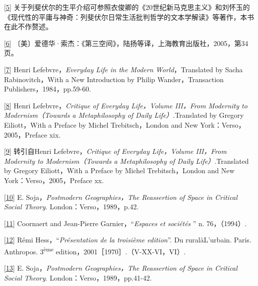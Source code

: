 \documentclass[UTF8, fontset = sourcesans, a4paper, oneside, zihao =
-4, scheme=chinese, no-math, space=true]{ctexbook}
\begin{document}
\protect\hypertarget{part0004.htmlux5cux23m5}{}{}\protect\hyperlink{part0004.htmlux5cux23w5}{{[}5{]}}
关于列斐伏尔的生平介绍可参照衣俊卿的《20世纪新马克思主义》和刘怀玉的《现代性的平庸与神奇：列斐伏尔日常生活批判哲学的文本学解读》等著作，本书在此不作赘述。

\protect\hypertarget{part0004.htmlux5cux23m6}{}{}\protect\hyperlink{part0004.htmlux5cux23w6}{{[}6{]}}
〔美〕爱德华·索杰：《第三空间》，陆扬等译，上海教育出版社，2005，第34页。

\protect\hypertarget{part0004.htmlux5cux23m7}{}{}\protect\hyperlink{part0004.htmlux5cux23w7}{{[}7{]}}
Henri Lefebvre，\emph{Everyday Life in the Modern World}，Translated by
Sacha Rabinovitch，With a New Introduction by Philip Wander，Transaction
Publishers，1984，pp.59-60.

\protect\hypertarget{part0004.htmlux5cux23m8}{}{}\protect\hyperlink{part0004.htmlux5cux23w8}{{[}8{]}}
Henri Lefebvre，\emph{Critique of Everyday Life，Volume III，From
Modernity to Modernism（Towards a Metaphilosophy of Daily
Life）}.Translated by Gregory Eiliott，With a Preface by Michel
Trebitsch，London and New York：Verso，2005，Preface xix.

\protect\hypertarget{part0004.htmlux5cux23m9}{}{}\protect\hyperlink{part0004.htmlux5cux23w9}{{[}9{]}}
转引自Henri Lefebvre，\emph{Critique of Everyday Life，Volume III，From
Modernity to Modernism（Towards a Metaphilosophy of Daily
Life）}.Translated by Gregory Eiliott，With a Preface by Michel
Trebitsch，London and New York：Verso，2005，Preface xx.

\protect\hypertarget{part0004.htmlux5cux23m10}{}{}\protect\hyperlink{part0004.htmlux5cux23w10}{{[}10{]}}
E. Soja，\emph{Postmodern Geographies，The Reassertion of Space in
Critical Social Theory}. London：Verso，1989，p.42.

\protect\hypertarget{part0004.htmlux5cux23m11}{}{}\protect\hyperlink{part0004.htmlux5cux23w11}{{[}11{]}}
Coornaert and Jean-Pierre Garnier，``\emph{Espaces et sociétés} '' n.
76，（1994）.

\protect\hypertarget{part0004.htmlux5cux23m12}{}{}\protect\hyperlink{part0004.htmlux5cux23w12}{{[}12{]}}
Rémi Hess，``\emph{Présentation de la troisième edition}''. Du
ruralàL'urbain. Paris. Anthropos. 3\textsuperscript{ème}
edition，2001［1970］.（V-XX-VI，VI）.

\protect\hypertarget{part0004.htmlux5cux23m13}{}{}\protect\hyperlink{part0004.htmlux5cux23w13}{{[}13{]}}
E. Soja，\emph{Postmodern Geographies，The Reassertion of Space in
Critical Social Theory}. London：Verso，1989，pp.41-42.
\end{document}
